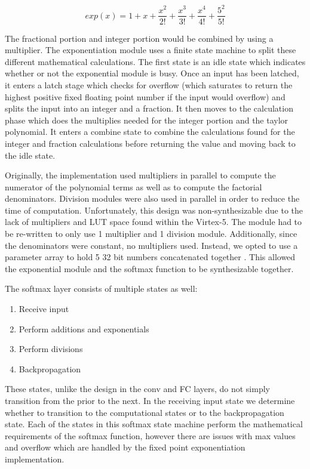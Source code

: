 \documentclass[11pt]{article}
\begin{document}
$$exp(x) = 1 + x + \frac{x^2}{2!} + \frac{x^3}{3!} + \frac{x^4}{4!} + \frac{5^2}{5!}$$

The fractional portion and integer portion would be combined by using a multiplier. The exponentiation module uses a finite state machine to split these different mathematical calculations. The first state is an idle state which indicates whether or not the exponential module is busy. Once an input has been latched, it enters a latch stage which checks for overflow (which saturates to return the highest positive fixed floating point number if the input would overflow) and splits the input into an integer and a fraction. It then moves to the calculation phase which does the multiplies needed for the integer portion and the taylor polynomial. It enters a combine state to combine the calculations found for the integer and fraction calculations before returning the value and moving back to the idle state. 

Originally, the implementation used multipliers in parallel to compute the numerator of the polynomial terms as well as to compute the factorial denominators. Division modules were also used in parallel in order to reduce the time of computation. Unfortunately, this design was non-synthesizable due to the lack of multipliers and LUT space found within the Virtex-5. The module had to be re-written to only use 1 multiplier and 1 division module. Additionally, since the denominators were constant, no multipliers used. Instead, we opted to use a parameter array to hold 5 32 bit numbers concatenated together . This allowed the exponential module and the softmax function to be synthesizable together. 

The softmax layer consists of multiple states as well:
\begin{enumerate}
	\item Receive input
	\item Perform additions and exponentials
	\item Perform divisions
	\item Backpropagation
\end{enumerate}

These states, unlike the design in the conv and FC layers, do not simply transition from the prior to the next. In the receiving input state we determine whether to transition to the computational states or to the backpropagation state. Each of the states in this softmax state machine perform the mathematical requirements of the softmax function, however there are issues with max values and overflow which are handled by the fixed point exponentiation implementation. 
\end{document}

